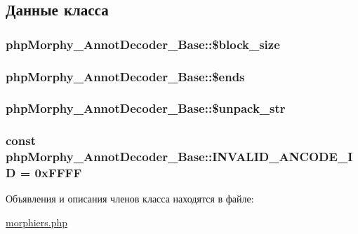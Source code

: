 \subsection{Данные класса}
\hypertarget{classphpMorphy__AnnotDecoder__Base_a0945ec17837f07552d2b833fc8e6248f}{
\subsubsection[{\$block\_\-size}]{\setlength{\rightskip}{0pt plus 5cm}phpMorphy\_\-AnnotDecoder\_\-Base::\$block\_\-size}}
\label{classphpMorphy__AnnotDecoder__Base_a0945ec17837f07552d2b833fc8e6248f}
\hypertarget{classphpMorphy__AnnotDecoder__Base_a24c333b8db6202039c23c51f04f8ee86}{
\subsubsection[{\$ends}]{\setlength{\rightskip}{0pt plus 5cm}phpMorphy\_\-AnnotDecoder\_\-Base::\$ends}}
\label{classphpMorphy__AnnotDecoder__Base_a24c333b8db6202039c23c51f04f8ee86}
\hypertarget{classphpMorphy__AnnotDecoder__Base_a5afe4eda27758b8e15157c8c0a7516d1}{
\subsubsection[{\$unpack\_\-str}]{\setlength{\rightskip}{0pt plus 5cm}phpMorphy\_\-AnnotDecoder\_\-Base::\$unpack\_\-str}}
\label{classphpMorphy__AnnotDecoder__Base_a5afe4eda27758b8e15157c8c0a7516d1}
\hypertarget{classphpMorphy__AnnotDecoder__Base_ae44885039ce6eb80fe01f589ef96e89d}{
\subsubsection[{INVALID\_\-ANCODE\_\-ID}]{\setlength{\rightskip}{0pt plus 5cm}const {\bf phpMorphy\_\-AnnotDecoder\_\-Base::INVALID\_\-ANCODE\_\-ID} = 0xFFFF}}
\label{classphpMorphy__AnnotDecoder__Base_ae44885039ce6eb80fe01f589ef96e89d}


Объявления и описания членов класса находятся в файле:\begin{DoxyCompactItemize}
\item 
\hyperlink{morphiers_8php}{morphiers.php}\end{DoxyCompactItemize}
